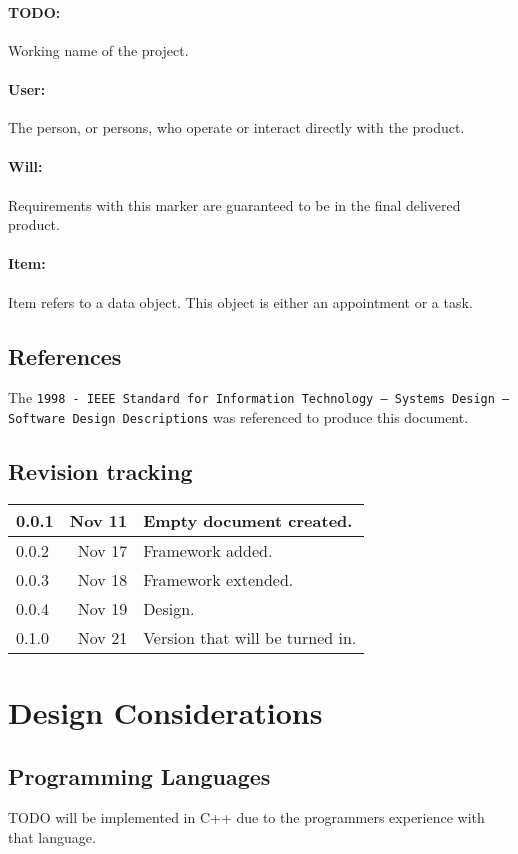 \documentclass[12pt]{article}
\begin{document}
\paragraph{TODO:} Working name of the project.
\paragraph{User:} The person, or persons, who operate or interact directly with the product.
\paragraph{Will:} Requirements with this marker are guaranteed to be in the final delivered product.
\paragraph{Item:} Item refers to a data object. This object is either an appointment or a task.

\subsection{References}
The {\tt 1998 - IEEE Standard for Information Technology -- Systems Design -- Software Design Descriptions} was referenced to produce this document.

\subsection{Revision tracking}
\begin{tabular}{|l|r|p{4.6in}|}
\hline
0.0.1 & Nov 11 & Empty document created.\\
\hline
0.0.2 & Nov 17 & Framework added.\\
\hline
0.0.3 & Nov 18 & Framework extended.\\
\hline
0.0.4 & Nov 19 & Design.\\
\hline
0.1.0 & Nov 21 & Version that will be turned in.\\
\hline
\end{tabular}

\section{Design Considerations}

\subsection{Programming Languages}
TODO will be implemented in C++ due to the programmers experience with that language.
\end{document}
